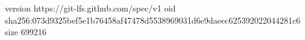 version https://git-lfs.github.com/spec/v1
oid sha256:073d9325bef5e1b76458af47478d5538969031d6e9daeec625392022044281c6
size 699216
